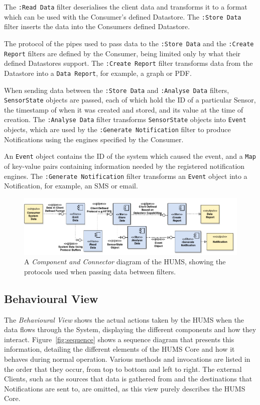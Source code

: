\documentclass[10pt,a4paper]{article}
\begin{document}
The \texttt{:Read Data} filter deserialises the client data and transforms it to a format which can be used with the Consumer's defined Datastore. The \texttt{:Store Data} filter inserts the data into the Consumers defined Datastore.

The protocol of the pipes used to pass data to the \texttt{:Store Data} and the \texttt{:Create Report} filters are defined by the Consumer, being limited only by what their defined Datastores support. The \texttt{:Create Report} filter transforms data from the Datastore into a \texttt{Data Report}, for example, a graph or PDF.

When sending data between the \texttt{:Store Data} and \texttt{:Analyse Data} filters, \texttt{SensorState} objects are passed, each of which hold the ID of a particular Sensor, the timestamp of when it was created and stored, and its value at the time of creation. The \texttt{:Analyse Data} filter transforms \texttt{SensorState} objects into \texttt{Event} objects, which are used by the \texttt{:Generate Notification} filter to produce Notifications using the engines specified by the Consumer.

An \texttt{Event} object contains the ID of the system which caused the event, and a \texttt{Map} of key-value pairs containing information needed by the registered notification engines. The \texttt{:Generate Notification} filter transforms an \texttt{Event} object into a Notification, for example, an SMS or email. 

\begin{figure}[ht]
  \includegraphics[width=\textwidth]{images/pipesAndFilters.pdf}
  \caption{A \emph{Component and Connector} diagram of the HUMS, showing the protocols used when passing data between filters.}
  \label{fig:pipesAndFilter}
\end{figure}

\subsection{Behavioural View}

The \emph{Behavioural View} shows the actual actions taken by the HUMS when the data flows through the System, displaying the different components and how they interact. Figure~\ref{fig:sequence} shows a sequence diagram that presents this information, detailing the different elements of the HUMS Core and how it behaves during normal operation. Various methods and invocations are listed in the order that they occur, from top to bottom and left to right. The external Clients, such as the sources that data is gathered from and the destinations that Notifications are sent to, are omitted, as this view purely describes the HUMS Core.
\end{document}
